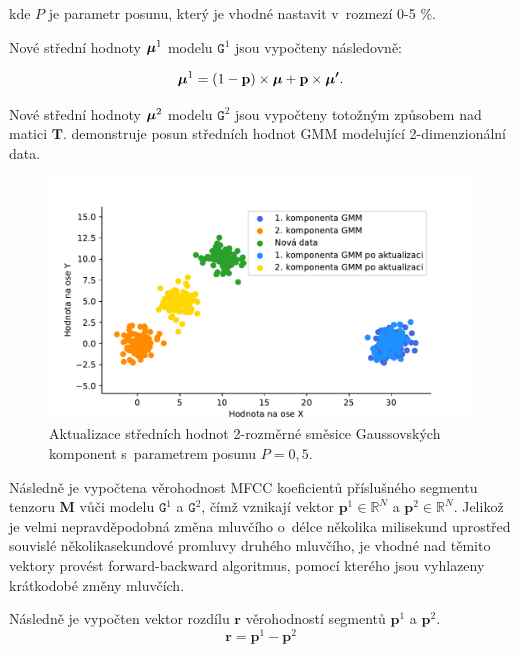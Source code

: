 \begin{enumerate}
    kde $P$ je parametr posunu, který je vhodné nastavit v~rozmezí 0-5 \%.
    
    Nové střední hodnoty $\text{\boldmath$\mu$}^{1}$  modelu $\mathtt{G}^{1}$ jsou vypočteny následovně:
    
    \begin{equation}
    \label{eqn:New_model_means}
        \text{\boldmath$\mu$}^{1} = (1 - \mathbf{p}) \times \text{\boldmath$\mu$} + \mathbf{p} \times \text{\boldmath$\mu'$}.
    \end{equation}
    
    Nové střední hodnoty $\text{\boldmath$\mu$}^{2}$ modelu $\mathtt{G}^{2}$ jsou vypočteny totožným způsobem nad matici $\mathbf{T}$.  demonstruje posun středních hodnot GMM modelující 2-dimenzionální data.
    
    
    \begin{figure}[ht]
      \centering
      \includegraphics[width=\textwidth]{obrazky-figures/gmm_update.pdf}
      \caption{Aktualizace středních hodnot 2-rozměrné směsice Gaussovských komponent s~parametrem posunu $P = 0,5$.}
      \label{fig:Center_actualization}
    \end{figure}
    
    Následně je vypočtena věrohodnost MFCC koeficientů příslušného segmentu tenzoru \textbf{M} vůči modelu $\mathtt{G}^{1}$ a $\mathtt{G}^{2}$, čímž vznikají vektor $\mathbf{p}^{1} \in \mathbb{R}^{N}$ a $\mathbf{p}^{2} \in \mathbb{R}^{N}$. Jelikož je velmi nepravděpodobná změna mluvčího o~délce několika milisekund uprostřed souvislé několikasekundové promluvy druhého mluvčího, je vhodné nad těmito vektory provést forward-backward algoritmus, pomocí kterého jsou vyhlazeny krátkodobé změny mluvčích. 
    
    Následně je vypočten vektor rozdílu $\mathbf{r}$ věrohodností segmentů $\mathbf{p}^{1}$ a $\mathbf{p}^{2}$.
    \begin{equation}
        \mathbf{r} = \mathbf{p}^{1} - \mathbf{p}^{2}
    \end{equation}
    

\end{enumerate}
